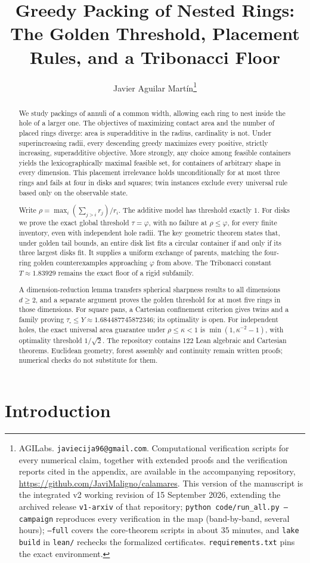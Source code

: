 \documentclass[11pt]{article}
\title{Greedy Packing of Nested Rings:\\ The Golden Threshold,
Placement Rules, and a Tribonacci Floor}
\author{Javier Aguilar Mart\'in\thanks{AGILabs.
\texttt{javiecija96@gmail.com}. Computational verification scripts for
every numerical claim, together with extended proofs and the verification
reports cited in the appendix, are available in the accompanying repository,
\url{https://github.com/JaviMaligno/calamares}. This version of the
manuscript is the integrated v2 working revision of 15 September 2026, extending
the archived release \texttt{v1-arxiv} of that repository;
\texttt{python code/run\_all.py --campaign} reproduces every
verification in the map (band-by-band, several hours);
\texttt{--full} covers the core-theorem scripts in about $35$
minutes, and \texttt{lake build} in \texttt{lean/} rechecks the
formalized certificates. \texttt{requirements.txt} pins the exact
environment.}}
\date{}
\theoremstyle{definition}
\begin{document}
\maketitle

\begin{abstract}
We study packings of annuli of a common width, allowing each ring to
nest inside the hole of a larger one. The objectives of maximizing
contact area and the number of placed rings diverge: area is
superadditive in the radius, cardinality is not. Under superincreasing
radii, every descending greedy maximizes every positive, strictly
increasing, superadditive objective. More strongly, any choice among
feasible containers yields the lexicographically maximal feasible set,
for containers of arbitrary shape in every dimension. This placement
irrelevance holds unconditionally for at most three rings and fails
at four in disks and squares; twin instances exclude every universal
rule based only on the observable state.

Write $\rho=\max_i(\sum_{j>i}r_j)/r_i$. The additive model has
threshold exactly $1$. For disks we prove the exact global threshold
$\tau=\varphi$, with no failure at $\rho\le\varphi$, for every finite
inventory, even with independent hole radii. The key geometric theorem
states that, under golden tail bounds, an entire disk list fits a
circular container if and only if its three largest disks fit. It
supplies a uniform exchange of parents, matching the four-ring golden
counterexamples approaching $\varphi$ from above. The Tribonacci
constant $T\approx1.83929$ remains the exact floor of a rigid subfamily.

A dimension-reduction lemma transfers spherical sharpness results to
all dimensions $d\ge2$, and a separate argument proves the golden
threshold for at most five rings in those dimensions. For square pans,
a Cartesian confinement criterion gives twins and a family proving
$\tau_{\square}\le Y\approx1.684487745872346$; its optimality is open.
For independent holes, the exact universal area guarantee under
$\rho\le\kappa<1$ is $\min(1,\kappa^{-2}-1)$, with optimality threshold
$1/\sqrt2$. The repository contains 122 Lean algebraic and Cartesian
theorems. Euclidean geometry, forest assembly and continuity remain
written proofs; numerical checks do not substitute for them.
\end{abstract}

\section{Introduction}
\end{document}
